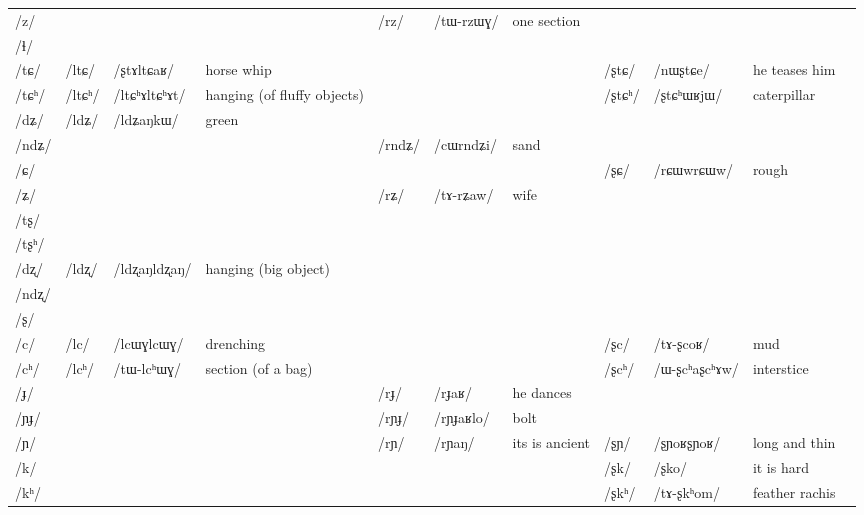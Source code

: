 \documentclass[oldfontcommands,oneside,a4paper,11pt]{article}
\newcommand{\ipa}[1]{{\phon/#1/}} %
\newcommand{\deux}[1]{/#1/}
\newcommand{\tib}[1]{\cellcolor{lightgray}\textbf{#1}}
\newcommand{\idph}[1]{\cellcolor{gray}\textbf{#1}}
\begin{document}
\begin{table}
{\begin{tabular}{l|lll|lll|lll|l}
\ipa{z}  & 	  & 	  & 	  & 	 \deux{rz}  & 	 \ipa{tɯ-rzɯɣ}  & 	 one section & 	 & 	 & 	 & 	\\	
\ipa{ɬ}  & 	  & 	  & 	  & 	  & 	  & 	  & 	 & 	 & 	 & 	\\	
\ipa{tɕ}  & 	 \deux{ltɕ}  & 	 \ipa{ʂtɤltɕaʁ}  & 	 horse whip  & 	 & 	 & 	 & 	 \deux{ʂtɕ}  & 	 \ipa{nɯʂtɕe}  & 	he teases him  & 	\\	
\ipa{tɕʰ}  & 	 \deux{ltɕʰ} \idph{}  & 	 \ipa{ltɕʰɤltɕʰɤt}  & 	hanging (of fluffy objects)  & 	 & 	 & 	 & 	 \deux{ʂtɕʰ}  & 	 \ipa{ʂtɕʰɯʁjɯ}  & 	caterpillar  & 	\\	
\ipa{dʑ}  & 	 \deux{ldʑ} \tib{}  & 	 \ipa{ldʑaŋkɯ}  & 	 green & 	  & 	  & 	  & 	 & 	 & 	 & 	\\	
\ipa{ndʑ}  & 	  & 	  & 	  & 	 \deux{rndʑ}  & 	 \ipa{cɯrndʑi}  & 	sand  & 	 & 	 & 	 & 	\\	
\ipa{ɕ}  & 	  & 	  & 	  & 	 & 	 & 	 & 	 \deux{ʂɕ}  & 	 \ipa{rɕɯwrɕɯw}  & 	rough & 	\\	
\ipa{ʑ}  & 	  & 	  & 	  & 	 \deux{rʑ}  & 	 \ipa{tɤ-rʑaw}  & 	wife  & 	 & 	 & 	 & 	\\	
\ipa{tʂ}  & 	  & 	  & 	  & 	  & 	  & 	  & 	 & 	 & 	 & 	\\	
\ipa{tʂʰ}  & 	  & 	  & 	  & 	  & 	  & 	  & 	 & 	 & 	 & 	\\	
\ipa{dʐ}  & 	 \deux{ldʐ} \idph{}  & 	 \ipa{ldʐaŋldʐaŋ}  & 	 hanging (big object) & 	  & 	  & 	  & 	 & 	 & 	 & 	\\	
\ipa{ndʐ}  & 	  & 	  & 	  & 	  & 	  & 	  & 	 & 	 & 	 & 	\\	
\ipa{ʂ}  & 	  & 	  & 	  & 	  & 	  & 	  & 	 & 	 & 	 & 	\\	
\ipa{c}  & 	 \deux{lc} \idph{} & 	 \ipa{lcɯɣlcɯɣ}  & 	 drenching & 	 & 	 & 	 & 	 \deux{ʂc}  & 	 \ipa{tɤ-ʂcoʁ}  & 	 mud & 	\\	
\ipa{cʰ}  & 	 \deux{lcʰ}  & 	 \ipa{tɯ-lcʰɯɣ}  & 	 section (of a bag) & 	 & 	 & 	 & 	 \deux{ʂcʰ}  & 	 \ipa{ɯ-ʂcʰaʂcʰɤw}  & 	 interstice & 	\\	
\ipa{ɟ}  & 	  & 	  & 	  & 	 \deux{rɟ}  & 	 \ipa{rɟaʁ}  & 	he dances  & 	 & 	 & 	 & 	\\	
\ipa{ɲɟ}  & 	  & 	  & 	  & 	 \deux{rɲɟ}  & 	 \ipa{rɲɟaʁlo}  & 	 bolt & 	 & 	 & 	 & 	\\	
\ipa{ɲ}  & 	  & 	  & 	  & 	 \deux{rɲ}  & 	 \ipa{rɲaŋ}  & 	 its is ancient & 	 \deux{ʂɲ} \idph{}  & 	\ipa{ʂɲoʁʂɲoʁ} & 	long and thin & 	\\	
\ipa{k}  & 	  & 	  & 	  & 	 & 	 & 	 & 	 \deux{ʂk}  & 	 \ipa{ʂko}  & 	 it is hard & 	\\	
\ipa{kʰ}  & 	  & 	  & 	  & 	 & 	 & 	 & 	 \deux{ʂkʰ}  & 	 \ipa{tɤ-ʂkʰom}  & 	 feather rachis & 	\\	

\end{tabular}}
\end{table}
\end{document}
